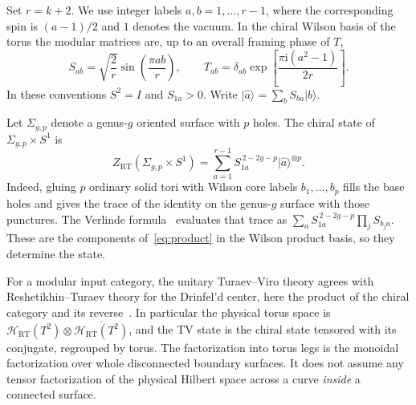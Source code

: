 \documentclass[11pt]{article}
\theoremstyle{remark}
\newcommand{\iu}{\mathrm{i}}
\newcommand{\RT}{\mathrm{RT}}
\newcommand{\ket}[1]{\lvert #1\rangle}
\newcommand{\tensor}{\mathbin{\otimes}}
\newcommand{\Surf}[2]{\Sigma_{#1,#2}}
\begin{document}
Set \(r=k+2\). We use integer labels \(a,b=1,\ldots,r-1\), where the corresponding spin is \((a-1)/2\) and \(1\) denotes the vacuum. In the chiral Wilson basis of the torus the modular matrices are, up to an overall framing phase of \(T\),
\begin{equation}\label{eq:ST}
 S_{ab}=\sqrt{\frac2r}\sin\!\left(\frac{\pi ab}{r}\right),
 \qquad
 T_{ab}=\delta_{ab}\exp\!\left[\frac{\pi\iu(a^2-1)}{2r}\right].
\end{equation}
In these conventions \(S^2=I\) and \(S_{1a}>0\). Write \(\ket{\widehat a}=\sum_b S_{ba}\ket b\).

Let \(\Surf{g}{p}\) denote a genus-\(g\) oriented surface with \(p\) holes. The chiral state of \(\Surf{g}{p}\times S^1\) is
\begin{equation}\label{eq:product}
 Z_{\RT}(\Surf{g}{p}\times S^1)=
 \sum_{a=1}^{r-1} S_{1a}^{\,2-2g-p}\ket{\widehat a}^{\tensor p}.
\end{equation}
Indeed, gluing \(p\) ordinary solid tori with Wilson core labels \(b_1,\dots,b_p\) fills the base holes and gives the trace of the identity on the genus-\(g\) surface with those punctures. The Verlinde formula~\cite{Verlinde,Fibered} evaluates that trace as
\(\sum_a S_{1a}^{\,2-2g-p}\prod_j S_{b_j a}\). These are the components of~\eqref{eq:product} in the Wilson product basis, so they determine the state.

For a modular input category, the unitary Turaev--Viro theory agrees with Reshetikhin--Turaev theory for the Drinfel'd center, here the product of the chiral category and its reverse~\cite{Balsam}. In particular the physical torus space is \(\mathcal H_{\RT}(T^2)\tensor\overline{\mathcal H_{\RT}(T^2)}\), and the TV state is the chiral state tensored with its conjugate, regrouped by torus. The factorization into torus legs is the monoidal factorization over whole disconnected boundary surfaces. It does not assume any tensor factorization of the physical Hilbert space across a curve \emph{inside} a connected surface.
\end{document}
